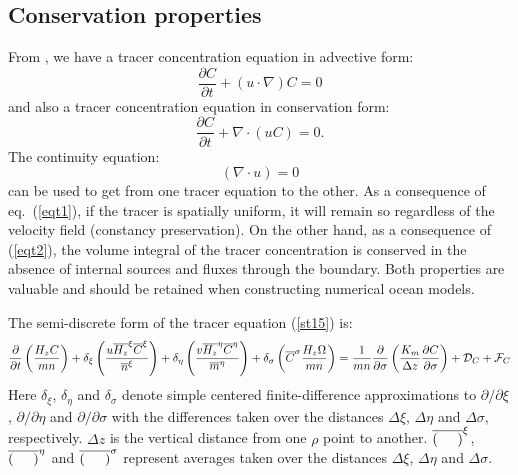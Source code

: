 \subsection{Conservation properties}
\label{Enrg}
From \citet{SS2005}, we have a
tracer concentration equation in advective form:
\begin{equation}
  \frac{\partial C}{\partial t} + (u \cdot \nabla) C = 0
  \label{eqt1}
\end{equation}
and also a tracer concentration equation in conservation form:
\begin{equation}
   \frac{\partial C}{\partial t} + \nabla \cdot (u C) = 0.
  \label{eqt2}
\end{equation}
The continuity equation:
\begin{equation}
   ( \nabla \cdot u) = 0
\end{equation}
can be used to get from one tracer equation to the other.
As a consequence of eq.~(\ref{eqt1}), if the tracer is spatially
uniform, it will remain so regardless of the velocity field
(constancy preservation). On the other hand, as a consequence of
(\ref{eqt2}), the volume integral of the tracer concentration is conserved
in the absence of internal sources and fluxes through the boundary. Both
properties are valuable and should be retained when constructing numerical
ocean models.

The semi-discrete form of the tracer equation
(\ref{st15}) is:
\begin{equation}
   \frac{\partial}{\partial t} \left( \frac{H_z C}{m n} \right)
   + \delta_{\xi} \left(
   \frac{u \overline{H_z}^\xi \overline{C}^\xi }{\overline{n}^\xi} \right)
   + \delta_{\eta} \left(
   \frac{v \overline{H_z}^\eta \overline{C}^\eta }{\overline{m}^\eta} \right)
   + \delta_\sigma \left( \overline{C}^\sigma
   \frac{H_z \Omega}{m n} \right) =
\\ \vspace{2mm}
   \frac{ 1}{mn} \frac{\partial}{\partial \sigma}
   \left( \frac{K_m}{\Delta z} \frac{\partial C}{\partial \sigma} \right) +
   {\cal D}_C + {\cal F}_C
\label{tfull}
\end{equation}
Here $\delta_{\xi}$, $\delta_{\eta}$ and $\delta_\sigma$ denote simple
centered finite-difference approximations to $\partial / \partial \xi$,
$\partial / \partial \eta$ and $\partial / \partial \sigma$ with the
differences taken over the distances $\Delta\xi$, $\Delta\eta$ and
$\Delta \sigma$, respectively. $\Delta z$ is the vertical distance from one
$\rho$ point to another. $\overline{ ( \hspace{5mm} )}^{\xi}$,
$\overline{ ( \hspace{5mm} )}^{\eta}$ and $\overline{ ( \hspace{5mm}
)}^\sigma$ represent averages taken over the distances $\Delta\xi$, $\Delta
\eta$ and $\Delta \sigma$. %

